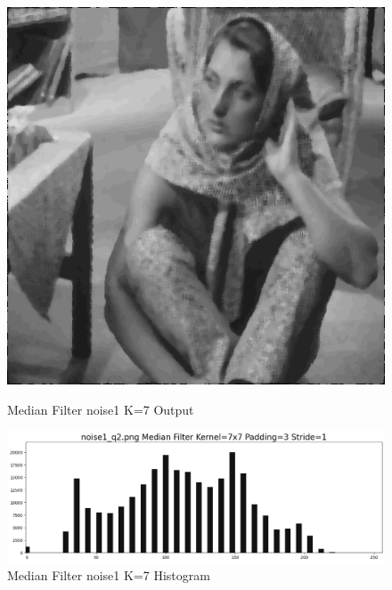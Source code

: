 \documentclass[12pt,a4paper]{report}
\begin{document}
\begin{figure}[!htb]
  \includegraphics[width=1\linewidth]{output/noise1_q2_K7P3.png}
  \caption{Median Filter noise1 K=7 Output}
  \includegraphics[width=1\linewidth]{output/noise1_q2_K7P3_his.png}
  \caption{Median Filter noise1 K=7 Histogram}
\end{figure}
\end{document}
